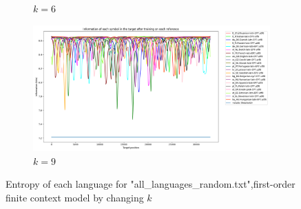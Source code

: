 \documentclass{article}
\begin{document}
\begin{figure}
\begin{subfigure}[b]{0.3\textwidth}
        \caption{$k = 6$}
        \label{fig:all_languages_random_p_c:1:6}
    \end{subfigure}
    \hfill
    \begin{subfigure}[b]{0.3\textwidth}
        \begin{center}
            \includegraphics[width=1.0\linewidth]{../results/all_languages_random/-p_c:1:9.png}
        \end{center}
        \caption{$k = 9$}
        \label{fig:all_languages_random_p_c:1:9}
    \end{subfigure}
    
    \caption{Entropy of each language for "all_languages_random.txt",first-order finite context model by changing $k$}
    \label{fig:all_languages_random_p_c:k}
\end{figure}
\end{document}
